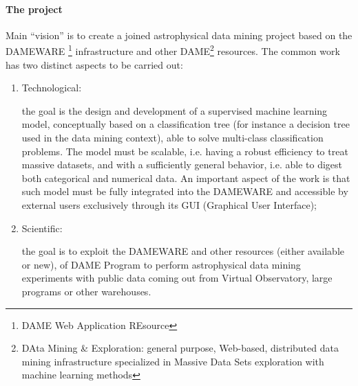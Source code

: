 \paragraph{The project}
Main “vision” is to create a joined astrophysical data mining project
based on the DAMEWARE \footnote{DAME Web Application REsource}
infrastructure and other DAME\footnote{DAta Mining \& Exploration:
  general purpose, Web-based, distributed data mining infrastructure
  specialized in Massive Data Sets exploration with machine learning
  methods } resources.  The common work  has two distinct
aspects to be carried out:

\begin{enumerate}
\item{Technological:} 

the goal is the design and development of a supervised machine learning model,
conceptually based on a classification tree (for instance a decision tree used in the data mining context),
able to solve multi-class classification problems. The model must be scalable, i.e. having a robust efficiency
to treat massive datasets, and with a sufficiently general behavior, i.e. able to digest both categorical and
numerical data. An important aspect of the work is that such model must be fully integrated into the
DAMEWARE and accessible by external users exclusively through its GUI (Graphical User Interface);

\item{Scientific:} 

the goal is to exploit the DAMEWARE and other resources (either
available or new), of DAME Program to perform astrophysical data
mining experiments with public data coming out from Virtual
Observatory, large programs or other warehouses.
\end{enumerate}










